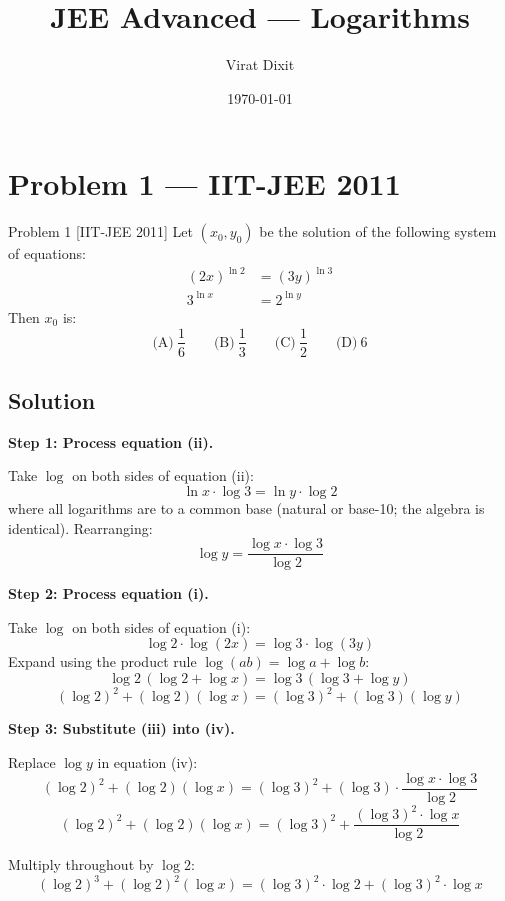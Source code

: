 \documentclass[12pt]{article}
\title{\textbf{JEE Advanced — Logarithms}}
\author{Virat Dixit}
\date{\today}
\begin{document}
\maketitle

\section{Problem 1 — IIT-JEE 2011}

\begin{problembox}{Problem 1 \hfill \normalfont\small [IIT-JEE 2011]}
Let $(x_0, y_0)$ be the solution of the following system of equations:
\begin{align}
(2x)^{\ln 2} &= (3y)^{\ln 3} \tag{i}\\
3^{\ln x} &= 2^{\ln y} \tag{ii}
\end{align}
Then $x_0$ is:
\[
\text{(A)}\ \frac{1}{6} \qquad
\text{(B)}\ \frac{1}{3} \qquad
\text{(C)}\ \frac{1}{2} \qquad
\text{(D)}\ 6
\]
\end{problembox}

\subsection*{Solution}

\textbf{Step 1: Process equation (ii).}

Take $\log$ on both sides of equation (ii):
\[
\ln x \cdot \log 3 = \ln y \cdot \log 2
\]
where all logarithms are to a common base (natural or base-10; the algebra is identical). Rearranging:
\[
\log y = \frac{\log x \cdot \log 3}{\log 2} \tag{iii}
\]

\textbf{Step 2: Process equation (i).}

Take $\log$ on both sides of equation (i):
\[
\log 2 \cdot \log(2x) = \log 3 \cdot \log(3y)
\]
Expand using the product rule $\log(ab) = \log a + \log b$:
\[
\log 2\,(\log 2 + \log x) = \log 3\,(\log 3 + \log y)
\]
\[
(\log 2)^2 + (\log 2)(\log x) = (\log 3)^2 + (\log 3)(\log y) \tag{iv}
\]

\textbf{Step 3: Substitute (iii) into (iv).}

Replace $\log y$ in equation (iv):
\[
(\log 2)^2 + (\log 2)(\log x) = (\log 3)^2 + (\log 3) \cdot \frac{\log x \cdot \log 3}{\log 2}
\]
\[
(\log 2)^2 + (\log 2)(\log x) = (\log 3)^2 + \frac{(\log 3)^2 \cdot \log x}{\log 2}
\]

Multiply throughout by $\log 2$:
\[
(\log 2)^3 + (\log 2)^2(\log x) = (\log 3)^2 \cdot \log 2 + (\log 3)^2 \cdot \log x
\]
\end{document}
